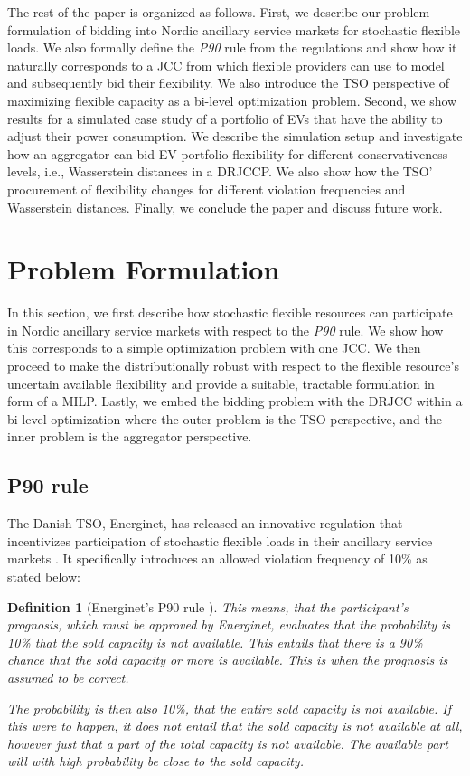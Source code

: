 \documentclass[conference]{IEEEtran}
\newtheorem{definition}{Definition} %
\begin{document}
The rest of the paper is organized as follows. First, we describe our problem formulation of bidding into Nordic ancillary service markets for stochastic flexible loads. We also formally define the \textit{P90} rule from the regulations and show how it naturally corresponds to a \ac{JCC} from which flexible providers can use to model and subsequently bid their flexibility. We also introduce the \ac{TSO} perspective of maximizing flexible capacity as a bi-level optimization problem. Second, we show results for a simulated case study of a portfolio of \acp{EV} that have the ability to adjust their power consumption. We describe the simulation setup and investigate how an aggregator can bid \ac{EV} portfolio flexibility for different conservativeness levels, i.e., Wasserstein distances in a \ac{DRJCCP}. We also show how the \ac{TSO}' procurement of flexibility changes for different violation frequencies and Wasserstein distances. Finally, we conclude the paper and discuss future work.

\section{Problem Formulation}\label{sec:problem-formulation}

In this section, we first describe how stochastic flexible resources can participate in Nordic ancillary service markets with respect to the \textit{P90} rule. We show how this corresponds to a simple optimization problem with one \ac{JCC}. We then proceed to make the distributionally robust with respect to the flexible resource's uncertain available flexibility and provide a suitable, tractable formulation in form of a \ac{MILP}. Lastly, we embed the bidding problem with the \ac{DRJCC} within a bi-level optimization where the outer problem is the \ac{TSO} perspective, and the inner problem is the aggregator perspective.

\subsection{P90 rule}

The Danish \ac{TSO}, Energinet, has released an innovative regulation that incentivizes participation of stochastic flexible loads in their ancillary service markets \cite{energinet}. It specifically introduces an allowed violation frequency of 10\% as stated below:

\begin{definition}[Energinet's P90 rule \cite{energinet}]\label{def:P90}
    This means, that the participant's prognosis, which must be approved by Energinet, evaluates that the probability is 10\% that the sold capacity is not available. This entails that there is a 90\% chance that the sold capacity or more is available. This is when the prognosis is assumed to be correct.

    The probability is then also 10\%, that the entire sold capacity is not available. If this were to happen, it does not entail that the sold capacity is not available at all, however just that a part of the total capacity is not available. The available part will with high probability be close to the sold capacity.
\end{definition}
\end{document}
